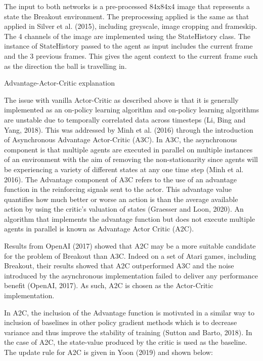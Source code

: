 \documentclass{article}
\begin{document}
The input to both networks is a pre-processed 84x84x4 image that represents a state the Breakout environment. The preprocessing applied is the same as that applied in Silver et al. (2015), including greyscale, image cropping and frameskip. The 4 channels of the image are implemented using the StateHistory class. The instance of StateHistory passed to the agent as input includes the current frame and the 3 previous frames. This gives the agent context to the current frame such as the direction the ball is travelling in.

Advantage-Actor-Critic explanation

The issue with vanilla Actor-Critic as described above is that it is generally implemented as an on-policy learning algorithm and on-policy learning algorithms are unstable due to temporally correlated data across timesteps (Li, Bing and Yang, 2018). This was addressed by Minh et al. (2016) through the introduction of Asynchronous Advantage Actor-Critic (A3C). In A3C, the asynchronous component is that multiple agents are executed in parallel on multiple instances of an environment with the aim of removing the non-stationarity since agents will be experiencing a variety of different states at any one time step (Minh et al. 2016). The Advantage component of A3C refers to the use of an advantage function in the reinforcing signals sent to the actor. This advantage value quantifies how much better or worse an action is than the average available action by using the critic's valuation of states (Graesser and Loon, 2020). An algorithm that implements the advantage function but does not execute multiple agents in parallel is known as Advantage Actor Critic (A2C).

Results from OpenAI (2017) showed that A2C may be a more suitable candidate for the problem of Breakout than A3C. Indeed on a set of Atari games, including Breakout, their results showed that A2C outperformed A3C and the noise introduced by the asynchronous implementation failed to deliver any performance benefit (OpenAI, 2017). As such, A2C is chosen as the Actor-Critic implementation.

In A2C, the inclusion of the Advantage function is motivated in a similar way to inclusion of baselines in other policy gradient methods which is to decrease variance and thus improve the stability of training (Sutton and Barto, 2018). In the case of A2C, the state-value produced by the critic is used as the baseline. The update rule for A2C is given in Yoon (2019) and shown below:
\end{document}

